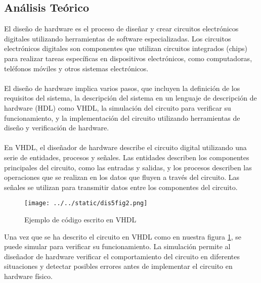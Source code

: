\documentclass{article}
\begin{document}
\begin{multicols}{2}
\section{Análisis Teórico}\label{sec:analiTeorico}
El diseño de hardware es el proceso de diseñar y crear circuitos electrónicos digitales utilizando herramientas de software especializadas. Los circuitos electrónicos digitales son componentes que utilizan circuitos integrados (chips) para realizar tareas específicas en dispositivos electrónicos, como computadoras, teléfonos móviles y otros sistemas electrónicos.\\
\\
El diseño de hardware implica varios pasos, que incluyen la definición de los requisitos del sistema, la descripción del sistema en un lenguaje de descripción de hardware (HDL) como VHDL, la simulación del circuito para verificar su funcionamiento, y la implementación del circuito utilizando herramientas de diseño y verificación de hardware.\\
\\
En VHDL, el diseñador de hardware describe el circuito digital utilizando una serie de entidades, procesos y señales. Las entidades describen los componentes principales del circuito, como las entradas y salidas, y los procesos describen las operaciones que se realizan en los datos que fluyen a través del circuito. Las señales se utilizan para transmitir datos entre los componentes del circuito.\\
\begin{figure}[H]
	\centering
	\texttt{[image: ../../static/dis5fig2.png]}
	\caption{Ejemplo de código escrito en VHDL}
	\label{fig:2}
\end{figure}

Una vez que se ha descrito el circuito en VHDL como en nuestra figura \ref{fig:2}, se puede simular para verificar su funcionamiento. La simulación permite al diseñador de hardware verificar el comportamiento del circuito en diferentes situaciones y detectar posibles errores antes de implementar el circuito en hardware físico.

\end{multicols}
\end{document}
